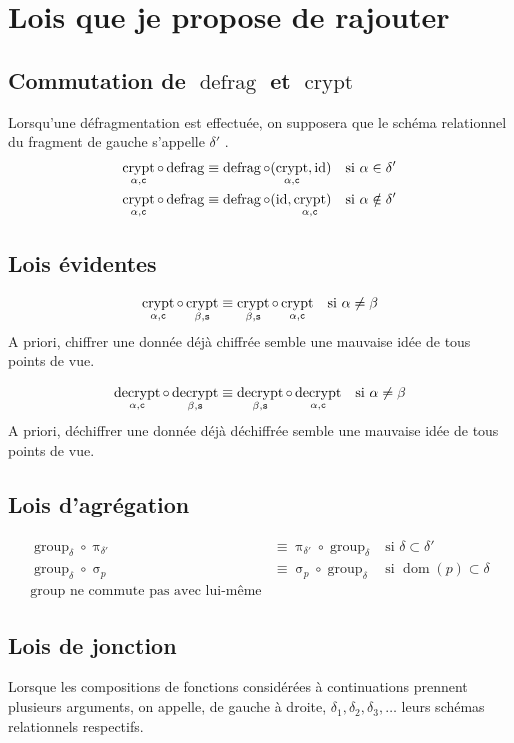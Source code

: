 \documentclass[french]{article}
\DeclareMathOperator{\proj}{\pi}
\DeclareMathOperator{\sel}{\sigma}
\DeclareMathOperator{\defrag}{defrag}
\DeclareMathOperator{\crypt}{crypt}
\DeclareMathOperator{\decrypt}{decrypt}
\DeclareMathOperator{\group}{group}
\DeclareMathOperator{\id}{id}
\DeclareMathOperator{\dom}{dom}
\newcommand\typeT[1]{\text{\ttfamily #1}}
\newcommand{\decryptArgs}[2]{\decrypt_{#1 , \typeT{#2}}}
\newcommand{\cryptArgs}[2]{\crypt_{#1 , \typeT{#2}}}
\newcommand{\selP}{\sel_p}
\newcommand{\decryptCAlpha}{\decryptArgs{\alpha}{c}}
\newcommand{\cryptCAlpha}{\cryptArgs{\alpha}{c}}
\newcommand{\groupDelta}{\group_{\delta}}
\begin{document}
\section*{Lois que je propose de rajouter}
\subsection*{Commutation de $\defrag$ et $\crypt$}
Lorsqu'une défragmentation est effectuée, on supposera que le schéma relationnel
du fragment de gauche s'appelle $\delta'$ .
\begin{align}
\cryptCAlpha \circ \defrag 
& \equiv \defrag \circ (\cryptCAlpha, \id)
& \text{si $\alpha \in \delta'$} \\
\cryptCAlpha \circ \defrag 
& \equiv \defrag \circ (\id, \cryptCAlpha)
& \text{si $\alpha \notin \delta'$} 
\end{align}

\subsection*{Lois évidentes}
\begin{align}
\cryptCAlpha \circ \cryptArgs{\beta}{s}
& \equiv \cryptArgs{\beta}{s} \circ \cryptCAlpha
& \text{si $\alpha \neq \beta$}
\end{align}
A priori, chiffrer une donnée déjà chiffrée semble une mauvaise idée de tous points de vue.

\begin{align}
\decryptCAlpha \circ \decryptArgs{\beta}{s}
& \equiv \decryptArgs{\beta}{s} \circ \decryptCAlpha
& \text{si $\alpha \neq \beta$}
\end{align}
A priori, déchiffrer une donnée déjà déchiffrée semble une mauvaise idée de tous points de vue.

\subsection*{Lois d'agrégation}
\begin{align}
\groupDelta \circ \proj_{\delta'}
& \equiv \proj_{\delta'} \circ \groupDelta
& \text{si $\delta \subset \delta'$} \\
\groupDelta \circ \selP 
& \equiv \selP \circ \groupDelta
& \text{si $\dom(p) \subset \delta$} \\
\text{$\group$ ne commute pas  avec lui-même}
\end{align}

\subsection*{Lois de jonction}
Lorsque les compositions de fonctions considérées à continuations prennent
plusieurs arguments,
on appelle, de gauche à droite,
$\delta_1, \delta_2, \delta_3, \dots$ leurs schémas relationnels respectifs.
\end{document}

